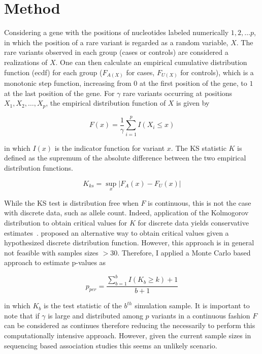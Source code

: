 \section{Method}
\label{sec:method}

Considering a gene with the positions of nucleotides labeled numerically $1, 2, \ldots p$, in which the position of a rare variant is regarded as a random variable, $X$.
The rare variants observed in each group (cases or controls) are considered a realizations of $X$.
One can then calculate an empirical cumulative distribution function (ecdf) for each group ($F_{A(X)}$ for cases, $F_{U(X)}$ for controls),
which is a monotonic step function, increasing from $0$ at the first position of the gene, to $1$ at the last position of the gene.
For $\gamma$ rare variants occurring at positions $X_1, X_2, \ldots, X_p$, the empirical distribution function of $X$ is given by

\begin{equation}
  F(x) = \frac{1}{\gamma}\sum^p_{i=1}I(X_i \leq x)
\end{equation}

in which $I(x)$ is the indicator function for variant $x$.
The KS statistic $K$ is defined as the supremum of the absolute difference between the two empirical distribution functions.

\begin{equation}
	K_{ks} = \sup_x | F_A(x) - F_U(x) |
\end{equation}

While the KS test is distribution free when $F$ is continuous, this is not the case with discrete data, such as allele count.
Indeed, application of the Kolmogorov distribution to obtain critical values for $K$ for discrete data yields conservative estimates~\cite{Walsh1963,Conover1972}. 
\citet{Conover1972} proposed an alternative way to obtain critical values given a hypothesized discrete distribution function.
However, this approach is in general not feasible with samples sizes $>30$.
Therefore, I applied a Monte Carlo based approach to estimate p-values as 

\begin{equation}
  p_{per} = \frac{\sum^b_{b=1} I(K_b \geq k)+1}{b+1}
\end{equation}

in which $K_b$ is the test statistic of the $b^{th}$ simulation sample.
It is important to note that if $\gamma$ is large and distributed among $p$ variants in a continuous fashion $F$ can be considered as continues therefore reducing the necessarily to perform this computationally intensive approach.
However, given the current sample sizes in sequencing based association studies this seems an unlikely scenario.

